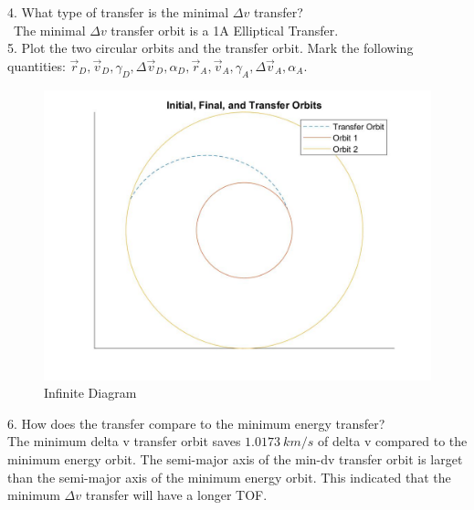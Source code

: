 \documentclass[hidelinks,12pt]{article}
\begin{document}
\vspace{10px}
4. What type of transfer is the minimal $\Delta v$ transfer?\\
~The minimal $\Delta v$ transfer orbit is a 1A Elliptical Transfer.\\


\vspace{10px}
5. Plot the two circular orbits and the transfer orbit. Mark the following quantities: $\vec{r}_D, \vec{v}_D, \gamma_D, \Delta \vec{v}_D, \alpha_D, \vec{r}_A, \vec{v}_A, \gamma_A, \Delta \vec{v}_A, \alpha_A$.\\
\begin{figure}[!htb]
  \center
  \includegraphics[scale=0.4]{orbits}
  \caption{Infinite Diagram}
  \label{fig:Fig02}
\end{figure}

\vspace{10px}
6. How does the transfer compare to the minimum energy transfer?\\
The minimum delta v transfer orbit saves $1.0173~km/s$ of delta v compared
to the minimum energy orbit. The semi-major axis of the min-dv transfer
orbit is larget than the semi-major axis of the minimum energy orbit.
This indicated that the minimum $\Delta v$ transfer will have a longer TOF.\\
\newpage

\end{document}
